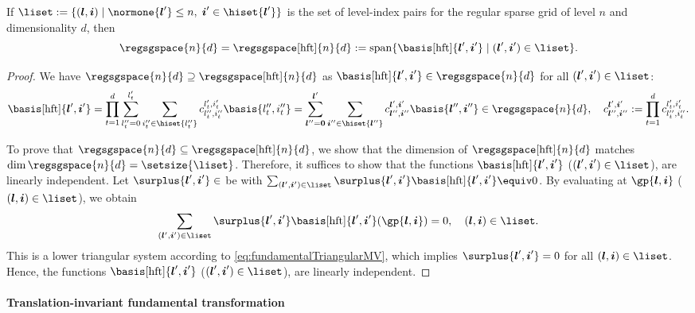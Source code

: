 \begin{proposition}
  \label{prop:hftSparseGridSpace}
  If $\liset := \{(\*l, \*i) \mid
  \normone{\*l'} \le n,\; \*i' \in \hiset{\*l'}\}$
  is the set of level-index pairs for the regular sparse grid of level $n$
  and dimensionality $d$, then
  \begin{equation}
    \regsgspace{n}{d}
    = \regsgspace[\hft]{n}{d}
    := \spn\{\basis[\hft]{\*l',\*i'} \mid (\*l', \*i') \in \liset\}.
  \end{equation}
\end{proposition}

\begin{proof}
  We have $\regsgspace{n}{d} \supset \regsgspace[\hft]{n}{d}$ as
  $\basis[\hft]{\*l',\*i'} \in \regsgspace{n}{d}$
  for all $(\*l', \*i') \in \liset$:
  \begin{equation}
    \basis[\hft]{\*l',\*i'}
    = \prod_{t=1}^d \sum_{l''_t=0}^{l'_t} \sum_{i''_t \in \hiset{l''_t}}
    c_{l''_t,i''_t}^{l'_t,i'_t} \basis{l''_t,i''_t}
    = \sum_{\*l''=\*0}^{\*l'} \sum_{\*i'' \in \hiset{\*l''}}
    c_{\*l'',\*i''}^{\*l',\*i'} \basis{\*l'',\*i''}
    \in \regsgspace{n}{d},\quad
    c_{\*l'',\*i''}^{\*l',\*i'}
    := \prod_{t=1}^d c_{l''_t,i''_t}^{l'_t,i'_t}.
  \end{equation}
  
  To prove that $\regsgspace{n}{d} \subset \regsgspace[\hft]{n}{d}$,
  we show that the dimension of $\regsgspace[\hft]{n}{d}$
  matches $\dim \regsgspace{n}{d} = \setsize{\liset}$.
  Therefore, it suffices to show that
  the functions $\basis[\hft]{\*l',\*i'}$ ($(\*l', \*i') \in \liset$),
  are linearly independent.
  Let $\surplus{\*l',\*i'} \in \real$ be with
  $\sum_{(\*l', \*i') \in \liset}
  \surplus{\*l',\*i'} \basis[\hft]{\*l',\*i'} \equiv 0$.
  By evaluating at $\gp{\*l,\*i}$ ($(\*l, \*i) \in \liset$), we obtain
  \begin{equation}
    \sum_{(\*l', \*i') \in \liset}
    \surplus{\*l',\*i'} \basis[\hft]{\*l',\*i'}(\gp{\*l,\*i}) = 0,\quad
    (\*l, \*i) \in \liset.
  \end{equation}
  This is a lower triangular system according to
  \eqref{eq:fundamentalTriangularMV},
  which implies $\surplus{\*l',\*i'} = 0$ for all $(\*l, \*i) \in \liset$.
  Hence, the functions $\basis[\hft]{\*l',\*i'}$ ($(\*l', \*i') \in \liset$),
  are linearly independent.
\end{proof}

\paragraph{Translation-invariant fundamental transformation}

